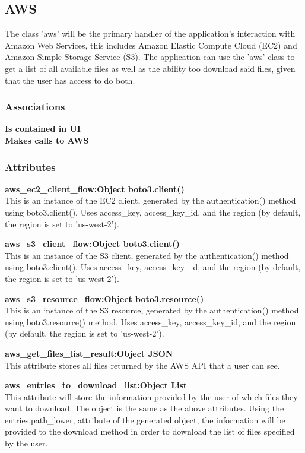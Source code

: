 \subsection{AWS}
The class 'aws' will be the primary handler of the application's interaction with Amazon Web Services,
this includes Amazon Elastic Compute Cloud (EC2) and Amazon Simple Storage Service (S3). The application
can use the 'aws' class to get a list of all available files as well as the ability too download said files, 
given that the user has access to do both.

\subsubsection{Associations}
\textbf{Is contained in UI} \\

\textbf{Makes calls to AWS} \\

\subsubsection{Attributes}
\textbf{aws\_ec2\_client\_flow:Object boto3.client()} \\
    This is an instance of the EC2 client, generated by the authentication() method using boto3.client(). Uses access\_key, access\_key\_id, and the region (by default, the region is set to 'us-west-2'). 

\textbf{aws\_s3\_client\_flow:Object boto3.client()} \\
    This is an instance of the S3 client, generated by the authentication() method using boto3.client(). Uses access\_key, access\_key\_id, and the region (by default, the region is set to 'us-west-2').

\textbf{aws\_s3\_resource\_flow:Object boto3.resource()} \\
    This is an instance of the S3 resource, generated by the authentication() method using boto3.resource() method. Uses access\_key, access\_key\_id, and the region (by default, the region is set to 'us-west-2').

\textbf{aws\_get\_files\_list\_result:Object JSON} \\
    This attribute stores all files returned by the AWS API that a user can see.

\textbf{aws\_entries\_to\_download\_list:Object List} \\
    This attribute will store the information provided by the user of which files they want to download. The object is the same as the above 
    attributes. Using the entries.path\_lower, attribute of the generated object, the information will be provided to the download method in 
    order to download the list of files specified by the user.


